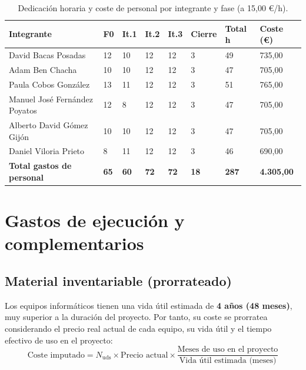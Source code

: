 \documentclass[11pt,a4paper]{article}
\begin{document}
\begin{table}[H]
  \centering
  \caption{Dedicación horaria y coste de personal por integrante y fase (a 15,00 €/h).}
  \label{tab:personal}
  \begin{tabularx}{\linewidth}{@{}Y C{0.8cm} C{0.85cm} C{0.85cm} C{0.85cm} C{1.1cm} C{1.4cm} R{2.1cm}@{}}
    \toprule
    \textbf{Integrante} & \textbf{F0} & \textbf{It.1} & \textbf{It.2} & \textbf{It.3} & \textbf{Cierre} & \textbf{Total h} & \textbf{Coste (€)} \\
    \midrule
    David Bacas Posadas & 12 & 10 & 12 & 12 & 3 & 49 & 735,00 \\
    Adam Ben Chacha & 10 & 10 & 12 & 12 & 3 & 47 & 705,00 \\
    Paula Cobos González & 13 & 11 & 12 & 12 & 3 & 51 & 765,00 \\
    Manuel José Fernández Poyatos & 12 & 8 & 12 & 12 & 3 & 47 & 705,00 \\
    Alberto David Gómez Gijón & 10 & 10 & 12 & 12 & 3 & 47 & 705,00 \\
    Daniel Viloria Prieto & 8 & 11 & 12 & 12 & 3 & 46 & 690,00 \\
    \midrule
    \textbf{Total gastos de personal} & \textbf{65} & \textbf{60} & \textbf{72} & \textbf{72} & \textbf{18} & \textbf{287} & \textbf{4.305,00} \\
    \bottomrule
  \end{tabularx}
\end{table}

\section{Gastos de ejecución y complementarios}

\subsection{Material inventariable (prorrateado)}

Los equipos informáticos tienen una vida útil estimada de \textbf{4 años (48 meses)}, muy superior a la duración del proyecto. Por tanto, su coste se prorratea considerando el precio real actual de cada equipo, su vida útil y el tiempo efectivo de uso en el proyecto:
\[
  \text{Coste imputado} = N_{\text{uds}} \times \text{Precio actual} \times \frac{\text{Meses de uso en el proyecto}}{\text{Vida útil estimada (meses)}}
\]
\end{document}
